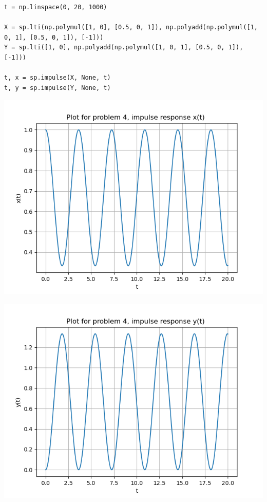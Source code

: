 \documentclass[12pt, a4paper]{report}
\begin{document}
\begin{verbatim}
t = np.linspace(0, 20, 1000)

X = sp.lti(np.polymul([1, 0], [0.5, 0, 1]), np.polyadd(np.polymul([1, 0, 1], [0.5, 0, 1]), [-1]))
Y = sp.lti([1, 0], np.polyadd(np.polymul([1, 0, 1], [0.5, 0, 1]), [-1]))

t, x = sp.impulse(X, None, t)
t, y = sp.impulse(Y, None, t)
\end{verbatim}

\begin{center}
	\includegraphics[scale=0.8]{4a.png} 
	\label{fig:rawdata}
\end{center}
\begin{center}
	\includegraphics[scale=0.8]{4b.png} 
	\label{fig:rawdata}
\end{center}
\end{document}
